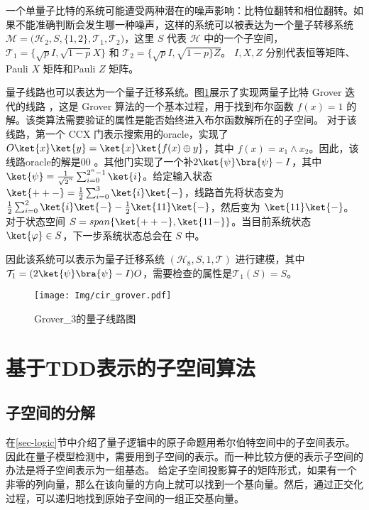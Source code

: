 \begin{example}
    一个单量子比特的系统可能遭受两种潜在的噪声影响：比特位翻转和相位翻转。如果不能准确判断会发生哪一种噪声，这样的系统可以被表达为一个量子转移系统 $\mathcal{M}=\big(\mathcal{H}_2,S,\{1,2\},{\mathcal{T}_1,\mathcal{T}_2} \big)$，这里 $S$ 代表 $\mathcal{H}$ 中的一个子空间，$\mathcal{T}_1=\{\sqrt{p}I, \sqrt{1-p}X\}$ 和 $\mathcal{T}_2=\{\sqrt{p}I, \sqrt{1-p\}Z}$。 $I,X,Z$ 分别代表恒等矩阵、Pauli $X$ 矩阵和Pauli $Z$ 矩阵。
\end{example}
\begin{example}
    \label{ex-image-grover}
    量子线路也可以表达为一个量子迁移系统。图\ref{fig:grover}展示了实现两量子比特 Grover 迭代的线路 \citep{Grover_1996}，这是 Grover 算法的一个基本过程，用于找到布尔函数 $f(x)=1$ 的解。该类算法需要验证的属性是能否始终进入布尔函数解所在的子空间。
    对于该线路，第一个 CCX 门表示搜索用的oracle，实现了$ O\ket{x}\ket{y}=\ket{x}\ket{f(x)\oplus y}$，其中 $f(x)=x_1 \wedge x_2$。因此，该线路oracle的解是\(00\) 。其他门实现了一个补$2\ket{\psi}\bra{\psi}-I$，其中$\ket{\psi}=\frac{1}{\sqrt{2}^{n}}\sum_{i=0}^{2^n-1}\ket{i}$。给定输入状态 $\ket{++-}=\frac{1}{2}\sum_{i=0}^3\ket{i}\ket{-}$，线路首先将状态变为 $\frac{1}{2}\sum_{i=0}^2 \ket{i}\ket{-}-\frac{1}{2}\ket{11}\ket{-}$，然后变为 $\ket{11}\ket{-}$。对于状态空间 $S=span\{\ket{++-},\ket{11-}\}$。当目前系统状态 $\ket{\varphi} \in S$，下一步系统状态总会在 $S$ 中。

    因此该系统可以表示为量子迁移系统 $(\mathcal{H}_8, S, {1}, \mathcal{T})$ 进行建模，其中 $\mathcal{T}_1 = {(2\ket{\psi}\bra{\psi}-I) O}$，需要检查的属性是$\mathcal{T}_1(S)=S$。
    \begin{figure}[!htbp]
        \centering
        \texttt{[image: Img/cir\_grover.pdf]}
        \caption{Grover\_3的量子线路图}
        \label{fig:grover}
    \end{figure} 
\end{example}
\section{基于TDD表示的子空间算法}
\subsection{子空间的分解}
在\ref{sec-logic}节中介绍了量子逻辑中的原子命题用希尔伯特空间中的子空间表示。
因此在量子模型检测中，需要用到子空间的表示。而一种比较方便的表示子空间的办法是将子空间表示为一组基态。
给定子空间投影算子的矩阵形式，如果有一个非零的列向量，那么在该向量的方向上就可以找到一个基向量。然后，通过正交化过程，可以递归地找到原始子空间的一组正交基向量。


